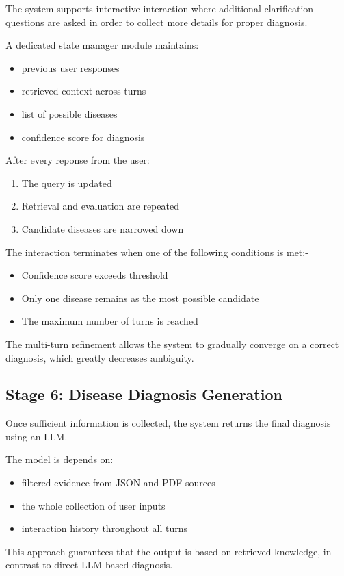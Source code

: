 \documentclass[conference]{IEEEtran}
\begin{document}
The system supports interactive interaction where additional clarification questions are asked in order to collect more details for proper diagnosis.

A dedicated state manager module maintains:

\begin{itemize}
    \item previous user responses
    \item retrieved context across turns
    \item list of possible diseases
    \item confidence score for diagnosis
\end{itemize}
After every reponse from the user:

\begin{enumerate}
    \item The query is updated
    \item Retrieval and evaluation are repeated
    \item Candidate diseases are narrowed down
\end{enumerate}
The interaction terminates when one of the following conditions is met:-

\begin{itemize}
    \item Confidence score exceeds threshold
    \item Only one disease remains as the most possible candidate
    \item The maximum number of turns is reached
\end{itemize}
The multi-turn refinement allows the system to gradually converge on a correct diagnosis, which greatly decreases ambiguity.

\subsection{Stage 6: Disease Diagnosis Generation}

Once sufficient information is collected, the system returns the final diagnosis using an LLM.

The model is depends on:

\begin{itemize}
    \item filtered evidence from JSON and PDF sources
    \item the whole collection of user inputs
    \item interaction history throughout all turns
\end{itemize}
This approach guarantees that the output is based on retrieved knowledge, in contrast to direct LLM-based diagnosis.
\end{document}
